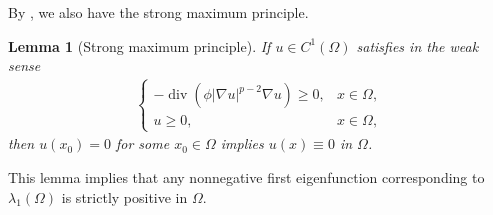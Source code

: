 \documentclass[11pt,leqno]{amsart}
\newtheorem{lemma}{Lemma}[section]
\def\div{\operatorname{div}}
\numberwithin{equation}{section}
\begin{document}
By  \cite[Theorem 8.1]{Serrin}, we also have the strong maximum principle.
\begin{lemma}[Strong maximum principle]\label{strong maximum principle}
    If $u\in C^{1}(\Omega)$ satisfies   in the weak sense
    \begin{align*}
        \begin{cases}
-\div\left(\phi |\nabla u|^{p-2}\nabla u\right) \geq 0, & x \in \Omega, \\[4pt]
u \geq 0, & x \in \Omega,
\end{cases}
    \end{align*}
  then $u(x_{0})=0$ for some $x_{0}\in \Omega$ implies $u(x)\equiv 0$ in $\Omega$.
\end{lemma}
This lemma implies that any nonnegative first eigenfunction corresponding to $\lambda_{1}(\Omega)$  is strictly positive in $\Omega$.
\end{document}
